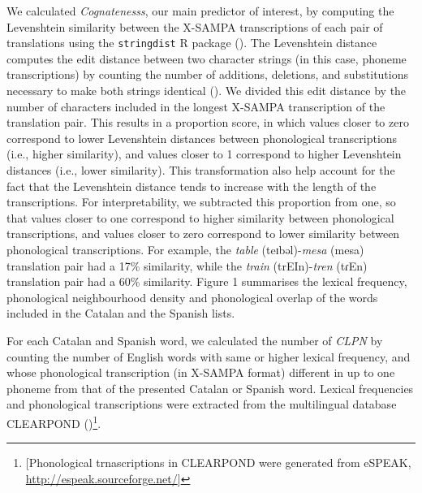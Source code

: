 \documentclass[
]{article}
\begin{document}
We calculated \emph{Cognatenesss}, our main predictor of interest, by
computing the Levenshtein similarity between the X-SAMPA transcriptions
of each pair of translations using the \texttt{stringdist} R package
(). The Levenshtein
distance computes the edit distance between two character strings (in
this case, phoneme transcriptions) by counting the number of additions,
deletions, and substitutions necessary to make both strings identical
(). We
divided this edit distance by the number of characters included in the
longest X-SAMPA transcription of the translation pair. This results in a
proportion score, in which values closer to zero correspond to lower
Levenshtein distances between phonological transcriptions (i.e., higher
similarity), and values closer to 1 correspond to higher Levenshtein
distances (i.e., lower similarity). This transformation also help
account for the fact that the Levenshtein distance tends to increase
with the length of the transcriptions. For interpretability, we
subtracted this proportion from one, so that values closer to one
correspond to higher similarity between phonological transcriptions, and
values closer to zero correspond to lower similarity between
phonological transcriptions. For example, the \emph{table}
(teɪbəl)-\emph{mesa} (mesa) translation pair had a 17\% similarity,
while the \emph{train} (trEIn)-\emph{tren} (tɾEn) translation pair had a
60\% similarity. Figure 1 summarises the lexical frequency, phonological
neighbourhood density and phonological overlap of the words included in
the Catalan and the Spanish lists.

For each Catalan and Spanish word, we calculated the number of
\emph{CLPN} by counting the number of English words with same or higher
lexical frequency, and whose phonological transcription (in X-SAMPA
format) different in up to one phoneme from that of the presented
Catalan or Spanish word. Lexical frequencies and phonological
transcriptions were extracted from the multilingual database CLEARPOND
()\footnote{{[}Phonological
  trnascriptions in CLEARPOND were generated from eSPEAK,
  \url{http://espeak.sourceforge.net/}{]}}.

\captionsetup{labelsep=none}
\end{document}
